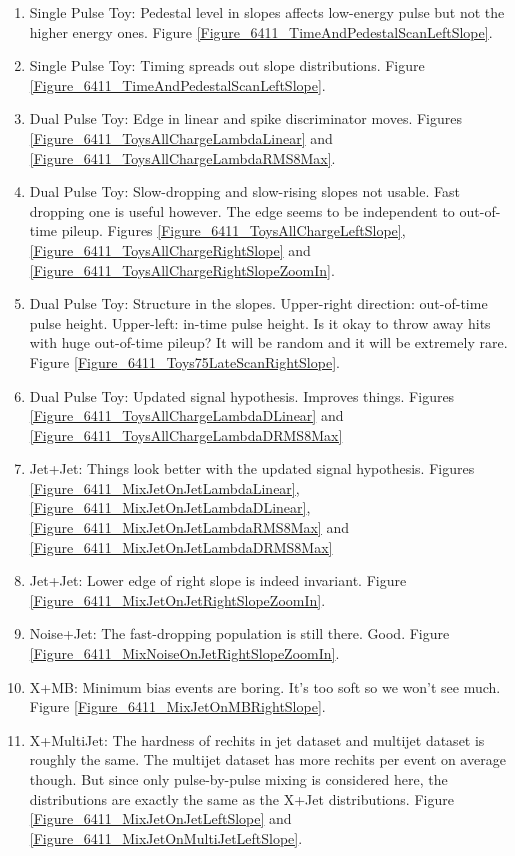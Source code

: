 \begin{enumerate}
\item Single Pulse Toy: Pedestal level in slopes affects low-energy pulse but not the higher energy ones.  Figure \ref{Figure_6411_TimeAndPedestalScanLeftSlope}.
\item Single Pulse Toy: Timing spreads out slope distributions.  Figure \ref{Figure_6411_TimeAndPedestalScanLeftSlope}.
\item Dual Pulse Toy: Edge in linear and spike discriminator moves.  Figures \ref{Figure_6411_ToysAllChargeLambdaLinear} and \ref{Figure_6411_ToysAllChargeLambdaRMS8Max}.
\item Dual Pulse Toy: Slow-dropping and slow-rising slopes not usable.  Fast dropping one is useful however.  The edge seems to be independent to out-of-time pileup.
Figures \ref{Figure_6411_ToysAllChargeLeftSlope}, \ref{Figure_6411_ToysAllChargeRightSlope} and \ref{Figure_6411_ToysAllChargeRightSlopeZoomIn}.
\item Dual Pulse Toy: Structure in the slopes.  Upper-right direction: out-of-time pulse height.  Upper-left: in-time pulse height.  Is it okay to throw away hits with huge out-of-time pileup?  It will be random and it will be extremely rare.
Figure \ref{Figure_6411_Toys75LateScanRightSlope}.
\item Dual Pulse Toy: Updated signal hypothesis.  Improves things.  Figures \ref{Figure_6411_ToysAllChargeLambdaDLinear} and \ref{Figure_6411_ToysAllChargeLambdaDRMS8Max}
\item Jet+Jet: Things look better with the updated signal hypothesis.
Figures \ref{Figure_6411_MixJetOnJetLambdaLinear}, \ref{Figure_6411_MixJetOnJetLambdaDLinear}, \ref{Figure_6411_MixJetOnJetLambdaRMS8Max} and \ref{Figure_6411_MixJetOnJetLambdaDRMS8Max}
\item Jet+Jet: Lower edge of right slope is indeed invariant.  Figure \ref{Figure_6411_MixJetOnJetRightSlopeZoomIn}.
\item Noise+Jet: The fast-dropping population is still there.  Good.  Figure \ref{Figure_6411_MixNoiseOnJetRightSlopeZoomIn}.
\item X+MB: Minimum bias events are boring.  It's too soft so we won't see much.  Figure \ref{Figure_6411_MixJetOnMBRightSlope}.
\item X+MultiJet: The hardness of rechits in jet dataset and multijet dataset is roughly the same.  The multijet dataset has more rechits per event on average though.
But since only pulse-by-pulse mixing is considered here, the distributions are exactly the same as the X+Jet distributions.  Figure \ref{Figure_6411_MixJetOnJetLeftSlope} and \ref{Figure_6411_MixJetOnMultiJetLeftSlope}.
\end{enumerate}

